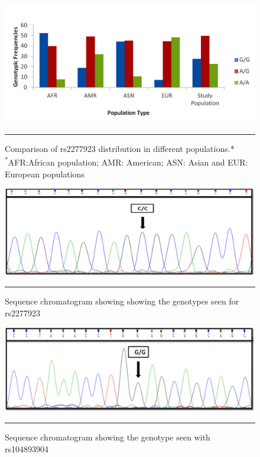 \begin{refsection}
\begin{figure}[!htb]
\centering
\includegraphics[width=\linewidth]{Figures/Figure5_9.pdf}
\rule{35em}{0.5pt}
\caption{Comparison of rs2277923 distribution in different populations.*\\{\textsuperscript{*}\footnotesize{AFR:African population; AMR: American; ASN: Asian and EUR: European populations}}}
\label{fig:5_9}
\end{figure}

\begin{figure}[!htb]
\centering
\includegraphics[width=\linewidth]{Figures/Figure5_6.pdf}
\rule{35em}{0.5pt}
\caption{Sequence chromatogram showing showing the genotypes seen for rs2277923}
\label{fig:5_6}
\end{figure}

\begin{figure}[!htb]
\centering
\includegraphics[width=\linewidth]{Figures/Figure5_7.pdf}
\rule{35em}{0.5pt}
\caption{Sequence chromatogram showing the genotype seen with rs104893904}
\label{fig:5_7}
\end{figure}


\end{refsection}
